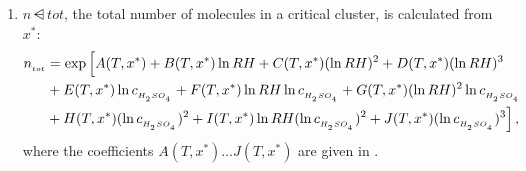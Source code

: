 \begin{enumerate}
  \item $n\dsub{tot}$, the total number of molecules in a critical cluster,
        is calculated from $x^*$:
        \begin{align}
          n\dsub{tot} &= \exp \Big[ A(T,x^*) + B(T,x^*) \ln RH
                         + C(T,x^*) (\ln RH)^2 + D(T,x^*) (\ln RH)^3 \nonumber \\
                      &+ E(T,x^*) \ln c\dsub{\sag} + F(T,x^*) \ln RH \ln c\dsub{\sag}
                         + G(T,x^*) (\ln RH)^2 \ln c\dsub{\sag} \nonumber \\
                      &+ H(T,x^*) (\ln c\dsub{\sag})^2
                       + I(T,x^*) \ln RH (\ln c\dsub{\sag})^2
                       + J(T,x^*) (\ln c\dsub{\sag})^3 \Big] \,, \labeleq{vk2002_ntot}
        \end{align}
        where the coefficients $A(T,x^*) \dots J(T,x^*)$ are given in
        .

\end{enumerate}
